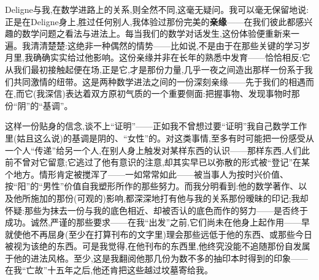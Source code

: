 Deligne与我,在数学进路上的关系,则全然不同,这毫无疑问。我可以毫无保留地说:正是在Deligne身上,胜过任何别人,我体验过那份完美的\textbf{亲缘}——在我们彼此都感兴趣的数学问题之看法与进法上。每当我们的数学对话发生,这份体验便重新来一遍。我清清楚楚:这绝非一种偶然的情势——比如说,不是由于在那些关键的学习岁月里,我确确实实给过他影响。这份亲缘并非在长年的熟悉中发育——恰恰相反:它从我们最初接触起便在场,正是它,才是那份力量,几乎一夜之间造出那样一份系于我们共同激情的纽带。这是两种数学进法之间的一份深刻亲缘\dmark{}——先于我们的相遇而在,而它(我深信)表达着双方原初气质的一个重要侧面:把握事物、发现事物时那份“阴”的“基调”。

这样一份贴身的信念,谈不上“证明”——正如我不曾想过要“证明”我自己数学工作里(姑且这么说)的基调是阴的、“女性”的。对这类事情,至多有时可能把一份感受从一个人“传递”给另一个人,在别人身上触发对某样东西的认识——那样东西,人们此前不曾对它留意;它逃过了他有意识的注意,却其实早已以弥散的形式被“登记”在某个地方。情形肯定被搅浑了——一如常常如此——被当事人为按时兴价值、按“阳”的“男性”价值自我塑形所作的那些努力。而我分明看到:他的数学著作、以及他所施加的那份(可观的)影响,都深深地打有他与我的关系那份暧昧的印记;我却怀疑:那些为抹去一份与我的底色相近、却被否认的底色而作的努力——是否终于成功。诚然,严谨的那些要求——在我“出发”之前,它们尚未在他身上起作用——早就使他不再屈身(至少在打算刊布的文字里)理会那些远低于他的东西、或那些今日被视为该绝的东西。可是我觉得,在他刊布的东西里,他终究没能不追随那份自发属于他的进法风格。至少,这是我翻阅他那几份为数不多的抽印本时得到的印象——在我“亡故”十五年之后,他还肯把这些越过坟墓寄给我。

